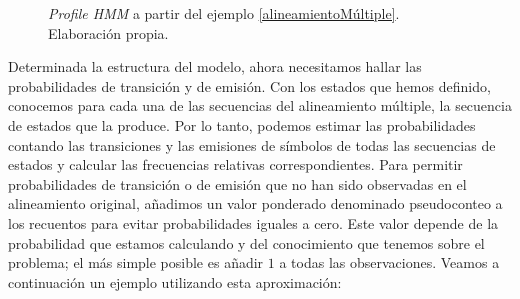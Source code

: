 \begin{figure}[H]
\caption{\textit{Profile HMM} a partir del ejemplo \ref{alineamientoMúltiple}. Elaboración propia.}
\label{profileHMMFinal}
\end{figure}

Determinada la estructura del modelo, ahora necesitamos hallar las probabilidades de transición y de emisión. Con los estados que hemos definido, conocemos para cada una de las secuencias del alineamiento múltiple, la secuencia de estados que la produce. Por lo tanto, podemos estimar las probabilidades contando las transiciones y las emisiones de símbolos de todas las secuencias de estados y calcular las frecuencias relativas correspondientes. Para permitir probabilidades de transición o de emisión que no han sido observadas en el alineamiento original, añadimos un valor ponderado denominado pseudoconteo a los recuentos para evitar probabilidades iguales a cero. Este valor depende de la probabilidad que estamos calculando y del conocimiento que tenemos sobre el problema; el más simple posible es añadir $1$ a todas las observaciones. Veamos a continuación un ejemplo utilizando esta aproximación:

